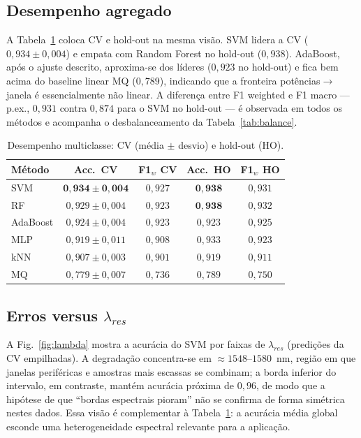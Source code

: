 \documentclass[conference]{IEEEtran}
\begin{document}
\subsection{Desempenho agregado}
A Tabela~\ref{tab:results} coloca CV e hold-out na mesma visão.
SVM lidera a CV ($0{,}934\pm0{,}004$) e empata com Random Forest no hold-out ($0{,}938$).
AdaBoost, após o ajuste descrito, aproxima-se dos líderes ($0{,}923$ no hold-out) e fica bem acima do baseline linear MQ ($0{,}789$), indicando que a fronteira potências$\to$janela é essencialmente não linear.
A diferença entre F1 weighted e F1 macro --- p.ex., $0{,}931$ contra $0{,}874$ para o SVM no hold-out --- é observada em todos os métodos e acompanha o desbalanceamento da Tabela~\ref{tab:balance}.

\begin{table}[!t]
\caption{Desempenho multiclasse: CV (média $\pm$ desvio) e hold-out (HO).}
\label{tab:results}
\centering
\setlength{\tabcolsep}{2.6pt}
\begin{tabular}{lcccc}
\toprule
Método & Acc.\ CV & F1$_w$ CV & Acc.\ HO & F1$_w$ HO \\
\midrule
SVM & $\mathbf{0{,}934\pm0{,}004}$ & $0{,}927$ & $\mathbf{0{,}938}$ & $0{,}931$ \\
RF & $0{,}929\pm0{,}004$ & $0{,}923$ & $\mathbf{0{,}938}$ & $0{,}932$ \\
AdaBoost & $0{,}924\pm0{,}004$ & $0{,}923$ & $0{,}923$ & $0{,}925$ \\
MLP & $0{,}919\pm0{,}011$ & $0{,}908$ & $0{,}933$ & $0{,}923$ \\
kNN & $0{,}907\pm0{,}003$ & $0{,}901$ & $0{,}919$ & $0{,}911$ \\
MQ & $0{,}779\pm0{,}007$ & $0{,}736$ & $0{,}789$ & $0{,}750$ \\
\bottomrule
\end{tabular}
\end{table}

\subsection{Erros versus $\lambda_{res}$}
A Fig.~\ref{fig:lambda} mostra a acurácia do SVM por faixas de $\lambda_{res}$ (predições da CV empilhadas).
A degradação concentra-se em ${\approx}1548$--$1580$~nm, região em que janelas periféricas e amostras mais escassas se combinam; a borda inferior do intervalo, em contraste, mantém acurácia próxima de $0{,}96$, de modo que a hipótese de que ``bordas espectrais pioram'' não se confirma de forma simétrica nestes dados.
Essa visão é complementar à Tabela~\ref{tab:results}: a acurácia média global esconde uma heterogeneidade espectral relevante para a aplicação.
\end{document}
